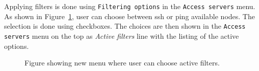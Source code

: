 {{{{\begin{table}[htb]
\centering
\caption{Structure and examples of availability table for filtering functionality.}
\label{table:availability}
\end{table}

Applying filters is done using \texttt{Filtering options} in the \texttt{Access servers} menu. As shown in Figure~\ref{fig:filtering}, user can choose between ssh or ping available nodes. The selection is done using checkboxes. The choices are then shown in the  \texttt{Access servers} menu on the top as \textit{Active filters} line with the listing of the active options. \\

\begin{figure}[H]
	\centering
	\caption{Figure showing new menu where user can choose active filters.}
	\label{fig:filtering}
\end{figure}

}}}}
